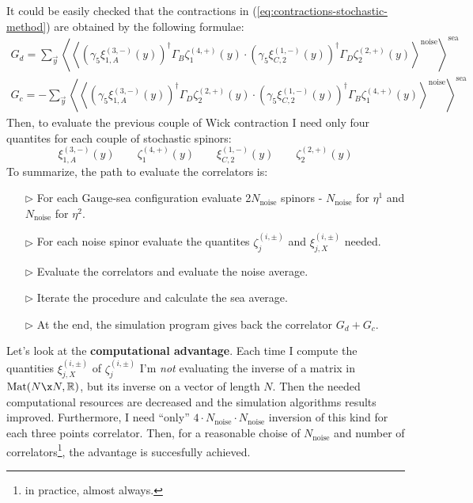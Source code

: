 \documentclass[english, LaM, oneside, noexaminfo]{sapthesis}
\begin{document}
It could be easily checked that the contractions in (\ref{eq:contractions-stochastic-method}) are obtained by the following formulae:
\begin{equation*}
    \begin{gathered}
        G_d =   \sum_{\vec y} \left\langle \left\langle \left(\gamma_5\xi^{(3,-)}_{1,A} (y) \right)^\dag \Gamma_B \zeta^{(4,+)}_1 (y) \cdot \left(\gamma_5\xi^{(1,-)}_{C,2} (y) \right)^\dag \Gamma_D \zeta^{(2,+)}_2 (y) \right\rangle^\text{noise} \right\rangle^{\text{sea}} \\
        G_c = - \sum_{\vec y} \left\langle \left\langle \left(\gamma_5\xi^{(3,-)}_{1,A} (y) \right)^\dag \Gamma_D \zeta^{(2,+)}_2 (y) \cdot \left(\gamma_5\xi^{(1,-)}_{C,2} (y) \right)^\dag \Gamma_B \zeta^{(4,+)}_1 (y) \right\rangle^\text{noise} \right\rangle^{\text{sea}}
    \end{gathered}
\end{equation*}
Then, to evaluate the previous couple of Wick contraction I need only four quantites for each couple of stochastic spinors:
\begin{equation*}
    \xi^{(3,-)}_{1,A} (y) \qquad  \zeta^{(4,+)}_1 (y) \qquad \xi^{(1,-)}_{C,2} (y) \qquad  \zeta^{(2,+)}_2 (y)
\end{equation*}
To summarize, the path to evaluate the correlators is:
\begin{itemize}
    \item [$\triangleright$] For each Gauge-sea configuration evaluate 2$N_{\text{noise}}$ spinors - $N_{\text{noise}}$ for $\eta^1$ and $N_{\text{noise}}$ for $\eta^2$. 
    \item [$\triangleright$] For each noise spinor evaluate the quantites $\zeta^{(i,\pm)}_j$ and $\xi^{(i,\pm)}_{j,X}$ needed.
    \item [$\triangleright$] Evaluate the correlators and evaluate the noise average.
    \item [$\triangleright$] Iterate the procedure and calculate the sea average.
    \item [$\triangleright$] At the end, the simulation program gives back the correlator $G_d+G_c$.
\end{itemize}
Let's look at the {\bf computational advantage}.
Each time I compute the quantities $\xi^{(i,\pm)}_{j,X}$ of $\zeta^{(i,\pm)}_j$ I'm {\it not} evaluating the inverse of a matrix in $\text{Mat}(N\x N, \mathbb{R})$, but its inverse on a vector of length $N$.
Then the needed computational resources are decreased and the simulation algorithms results improved.
Furthermore, I need ``only'' $4\cdot N_\text{noise} \cdot N_\text{noise}$ inversion of this kind for each three points correlator.
Then, for a reasonable choise of $N_\text{noise}$ and number of correlators\footnote{in practice, almost always.}, the advantage is succesfully achieved.
\end{document}
